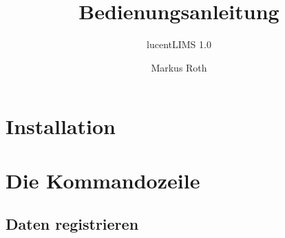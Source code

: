 \documentclass[11pt]{scrartcl} %
\title{Bedienungsanleitung}
\subtitle{lucentLIMS 1.0}
\author{Markus Roth}
\begin{document}
\maketitle

\section{Installation}



\section{Die Kommandozeile}
\subsection{Daten registrieren}


\end{document}
